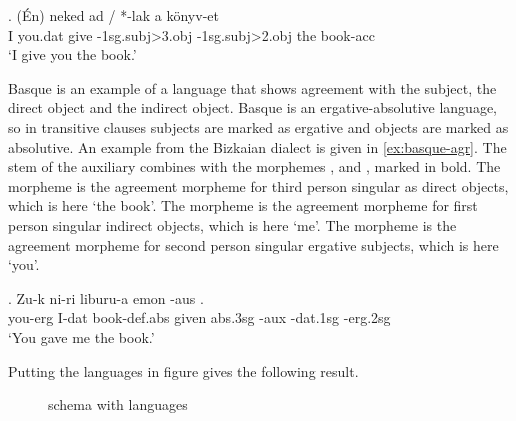 \exg. (Én) neked ad / *-lak a könyv-et\\
 I you.\ac{dat} give -1\ac{sg}.\ac{subj}>3.\ac{obj} -1\ac{sg}.\ac{subj}>2.\ac{obj} the book-\ac{acc}\\
 `I give you the book.' \label{ex:hungarian-agr}

Basque is an example of a language that shows agreement with the subject, the direct object and the indirect object. Basque is an ergative-absolutive language, so in transitive clauses subjects are marked as ergative and objects are marked as absolutive. An example from the Bizkaian dialect is given in \ref{ex:basque-agr}. The stem of the auxiliary  combines with the morphemes ,  and , marked in bold. The morpheme  is the agreement morpheme for third person singular as direct objects, which is here  `the book'. The morpheme  is the agreement morpheme for first person singular indirect objects, which is here  `me'. The morpheme  is the agreement morpheme for second person singular ergative subjects, which is here  `you'.

\exg. Zu-k ni-ri liburu-a emon  -aus  .\\
 you-\ac{erg} I-\ac{dat} book-\ac{def}.\ac{abs} given \ac{abs}.3\ac{sg} -\ac{aux} -\ac{dat}.1\ac{sg} -\ac{erg}.2\ac{sg}\\
 `You gave me the book.' \label{ex:basque-agr}

Putting the languages in  figure gives the following result.

 \begin{figure}[ht]
   \centering
   \caption{ schema with languages}
   \label{fig:agr-sub-do-io-lang}
 \end{figure}

